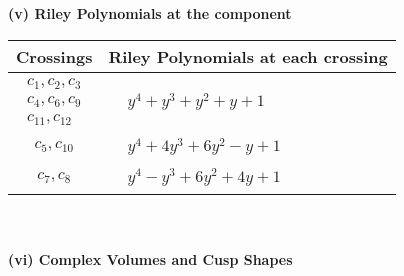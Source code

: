 \documentclass[1p]{elsarticle_modified}
\theoremstyle{definition}
\begin{document}
\newpage\renewcommand{\arraystretch}{1}
\flushleft \textbf{(v) Riley Polynomials at the component}\newline \\
\begin{tabular}{m{50pt}|m{274pt}}
Crossings & \hspace{64pt}Riley Polynomials at each crossing \\
\hline $$\begin{aligned}c_{1},c_{2},c_{3}\\c_{4},c_{6},c_{9}\\c_{11},c_{12}\end{aligned}$$&$\begin{aligned}
&y^4+y^3+y^2+y+1
\end{aligned}$\\
\hline $$\begin{aligned}c_{5},c_{10}\end{aligned}$$&$\begin{aligned}
&y^4+4 y^3+6 y^2- y+1
\end{aligned}$\\
\hline $$\begin{aligned}c_{7},c_{8}\end{aligned}$$&$\begin{aligned}
&y^4- y^3+6 y^2+4 y+1
\end{aligned}$\\
\hline
\end{tabular}\\~\\
\newpage\flushleft \textbf{(vi) Complex Volumes and Cusp Shapes}
\end{document}
